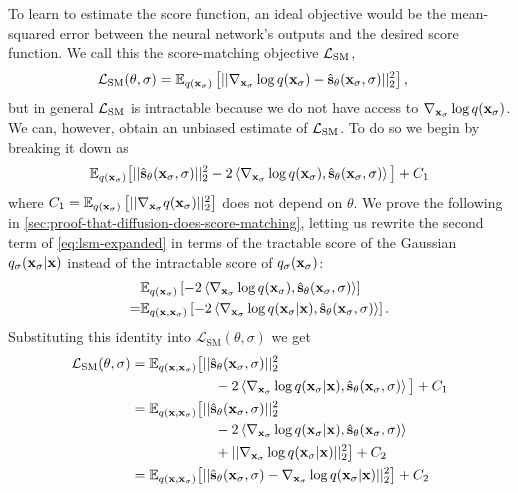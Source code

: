 To learn to estimate the score function, an ideal objective would be the mean-squared error between the neural network's outputs and the desired score function. We call this the score-matching objective ${\mathcal{L}}_\text{SM}$,
\begin{align}
    \mathcal{L}_\text{SM}(\theta, \sigma) &= \mathbb{E}_{q({\mathbf{x}}_\sigma)} \left[ || \nabla_{{\mathbf{x}}_\sigma} \log q({\mathbf{x}}_\sigma) - \hat{{\mathbf{s}}}_\theta({\mathbf{x}}_\sigma, \sigma) ||_2^2 \right],
\end{align}
but in general ${\mathcal{L}}_\text{SM}$ is intractable because we do not have access to $\nabla_{{\mathbf{x}}_\sigma} \log q({\mathbf{x}}_\sigma)$. We can, however, obtain an unbiased estimate of ${\mathcal{L}}_\text{SM}$. To do so we begin by breaking it down as
\begin{align} \label{eq:lsm-expanded}
    \mathbb{E}_{q({\mathbf{x}}_\sigma)} \big[ 
    || \hat{{\mathbf{s}}}_\theta({\mathbf{x}}_\sigma, \sigma) ||_2^2
    - 2 \left\langle \nabla_{{\mathbf{x}}_\sigma} \log q({\mathbf{x}}_\sigma),
    \hat{{\mathbf{s}}}_\theta({\mathbf{x}}_\sigma, \sigma) \right\rangle \big]
    + C_1
\end{align}
where $C_1 = \mathbb{E}_{q({\mathbf{x}}_\sigma)} \left[ || \nabla_{{\mathbf{x}}_\sigma} q({\mathbf{x}}_\sigma) ||_2^2 \right]$ does not depend on $\theta$. We prove the following in \cref{sec:proof-that-diffusion-does-score-matching}, letting us rewrite the second term of \cref{eq:lsm-expanded} in terms of the tractable score of the Gaussian $q_{\sigma}({\mathbf{x}}_\sigma|{\mathbf{x}})$ instead of the intractable score of $q_{\sigma}({\mathbf{x}}_\sigma)$:
\begin{align}
\allowdisplaybreaks
    &\EX_{q(\rvx_\sigma)} \left[ - 2 \left\langle \nabla_{\rvx_\sigma} \log q(\rvx_\sigma), \preds_\theta(\rvx_\sigma, \sigma) \right\rangle \right] \\
    =& \EX_{q(\rvx, \rvx_\sigma)} \left[ -2 \left\langle \nabla_{\rvx_\sigma} \log q(\rvx_\sigma|\rvx), \preds_\theta(\rvx_\sigma, \sigma) \right\rangle  \right]. \nonumber
\end{align}
Substituting this identity into $\mathcal{L}_\text{SM}(\theta, \sigma)$ we get
\begin{align}
    \mathcal{L}_\text{SM}(\theta, \sigma) &= \mathbb{E}_{q({\mathbf{x}}, {\mathbf{x}}_\sigma)} \big[ 
    || \hat{{\mathbf{s}}}_\theta({\mathbf{x}}_\sigma, \sigma) ||_2^2
    \\ &\qquad\qquad\qquad\nonumber
    - 2 \left\langle \nabla_{{\mathbf{x}}_\sigma} \log q({\mathbf{x}}_\sigma|{\mathbf{x}}), \hat{{\mathbf{s}}}_\theta({\mathbf{x}}_\sigma, \sigma) \right\rangle \big] + C_1 \\
    &= \mathbb{E}_{q({\mathbf{x}}, {\mathbf{x}}_\sigma)} \big[ 
    || \hat{{\mathbf{s}}}_\theta({\mathbf{x}}_\sigma, \sigma) ||_2^2
    \\ &\qquad\qquad\qquad
    - 2 \left\langle \nabla_{{\mathbf{x}}_\sigma} \log q({\mathbf{x}}_\sigma|{\mathbf{x}}), \hat{{\mathbf{s}}}_\theta({\mathbf{x}}_\sigma, \sigma) \right\rangle
    \nonumber\\ &\qquad\qquad\qquad
    + || \nabla_{{\mathbf{x}}_\sigma} \log q({\mathbf{x}}_\sigma|{\mathbf{x}}) ||_2^2 \big] + C_2 \nonumber \\
    &= \mathbb{E}_{q({\mathbf{x}}, {\mathbf{x}}_\sigma)} \big[ 
    || \hat{{\mathbf{s}}}_\theta({\mathbf{x}}_\sigma, \sigma) - \nabla_{{\mathbf{x}}_\sigma} \log q({\mathbf{x}}_\sigma|{\mathbf{x}}) ||_2^2 \big] + C_2
\end{align}
